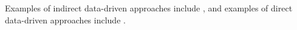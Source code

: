 Examples of indirect data-driven approaches include \cite{qin2006overview, di2021confidence, shin2020unifying, proctor2016dmdc, lu2020characterizing, zhang2019online, leyang2012properties}, and examples of direct data-driven approaches include \cite{de2019formulas, berberich2020robust, van2020noisy, berberich2022combining}.

